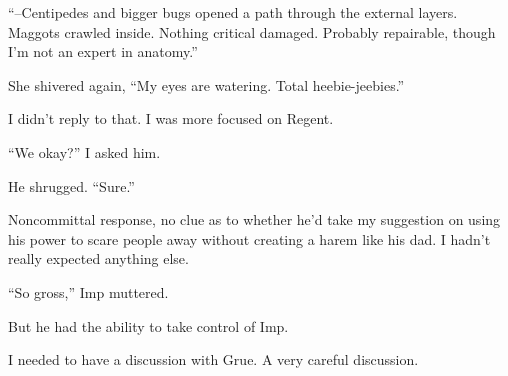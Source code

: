 ``--Centipedes and bigger bugs opened a path through the external layers.  Maggots crawled inside.  Nothing critical damaged.  Probably repairable, though I'm not an expert in anatomy.''



She shivered again, ``My eyes are watering.  Total heebie-jeebies.''



I didn't reply to that.  I was more focused on Regent.



``We okay?'' I asked him.



He shrugged.  ``Sure.''



Noncommittal response, no clue as to whether he'd take my suggestion on using his power to scare people away without creating a harem like his dad.  I hadn't really expected anything else.



``So gross,'' Imp muttered.



But he had the ability to take control of Imp.



I needed to have a discussion with Grue.  A very careful discussion.





